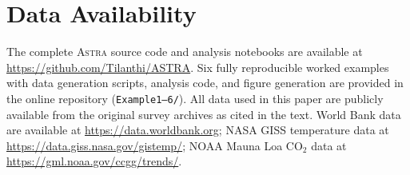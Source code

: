 \documentclass[usenatbib]{rasti}
\newcommand{\astra}{\textsc{Astra}\xspace}
\begin{document}
\section*{Data Availability}

The complete \astra source code and analysis notebooks are available at \url{https://github.com/Tilanthi/ASTRA}.
Six fully reproducible worked examples with data generation scripts, analysis code, and figure generation are provided in the online repository (\texttt{Example1--6/}).
All data used in this paper are publicly available from the original survey archives as cited in the text.
World Bank data are available at \url{https://data.worldbank.org}; NASA GISS temperature data at \url{https://data.giss.nasa.gov/gistemp/}; NOAA Mauna Loa CO$_{2}$ data at \url{https://gml.noaa.gov/ccgg/trends/}.



\end{document}
